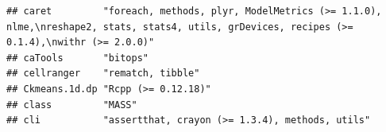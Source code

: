 \documentclass[]{article}
\begin{document}
\begin{verbatim}
## caret         "foreach, methods, plyr, ModelMetrics (>= 1.1.0), nlme,\nreshape2, stats, stats4, utils, grDevices, recipes (>= 0.1.4),\nwithr (>= 2.0.0)"                                                                                                                                                                                                                                                                                                                                            
## caTools       "bitops"                                                                                                                                                                                                                                                                                                                                                                                                                                                                              
## cellranger    "rematch, tibble"                                                                                                                                                                                                                                                                                                                                                                                                                                                                     
## Ckmeans.1d.dp "Rcpp (>= 0.12.18)"                                                                                                                                                                                                                                                                                                                                                                                                                                                                   
## class         "MASS"                                                                                                                                                                                                                                                                                                                                                                                                                                                                                
## cli           "assertthat, crayon (>= 1.3.4), methods, utils"                                                                                                                                                                                                                                                                                                                                                                                                                                       

\end{verbatim}
\end{document}
